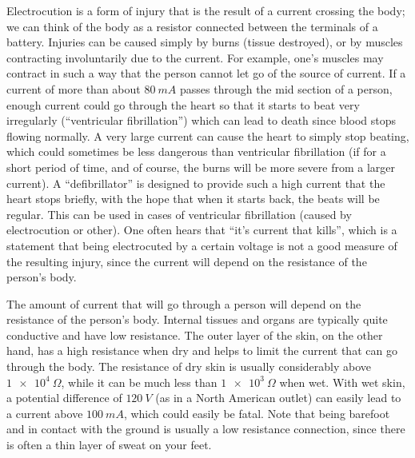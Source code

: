 Electrocution is a form of injury that is the result of a current crossing the body; we can think of the body as a resistor connected between the terminals of a battery. Injuries can be caused simply by burns (tissue destroyed), or by muscles contracting involuntarily due to the current. For example, one's muscles may contract in such a way that the person cannot let go of the source of current. If a current of more than about $\SI{80}{mA}$ passes through the mid section of a person, enough current could go through the heart so that it starts to beat very irregularly (``ventricular fibrillation'') which can lead to death since blood stops flowing normally. A very large current can cause the heart to simply stop beating, which could sometimes be less dangerous than ventricular fibrillation (if for a short period of time, and of course, the burns will be more severe from a larger current). A ``defibrillator'' is designed to provide such a high current that the heart stops briefly, with the hope that when it starts back, the beats will be regular. This can be used in cases of ventricular fibrillation (caused by electrocution or other). One often hears that ``it's current that kills'', which is a statement that being electrocuted by a certain voltage is not a good measure of the resulting injury, since the current will depend on the resistance of the person's body.

The amount of current that will go through a person will depend on the resistance of the person's body. Internal tissues and organs are typically quite conductive and have low resistance. The outer layer of the skin, on the other hand, has a high resistance when dry and helps to limit the current that can go through the body. The resistance of dry skin is usually considerably above $\SI{1e4}{\Omega}$, while it can be much less than $\SI{1e3}{\Omega}$ when wet. With wet skin, a potential difference of $\SI{120}{V}$ (as in a North American outlet) can easily lead to a current above $\SI{100}{mA}$, which could easily be fatal. Note that being barefoot and in contact with the ground is usually a low resistance connection, since there is often a thin layer of sweat on your feet.

